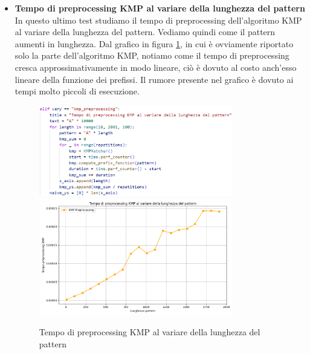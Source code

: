 \documentclass{article}
\begin{document}
\begin{itemize}
    \item \textbf{Tempo di preprocessing KMP al variare della lunghezza del pattern}\\
        In questo ultimo test studiamo il tempo di preprocessing dell'algoritmo KMP al variare della lunghezza del pattern. Vediamo quindi come il pattern aumenti in lunghezza. Dal grafico in figura \ref{fig:test-8}, in cui è ovviamente riportato solo la parte dell'algoritmo KMP, notiamo come il tempo di preprocessing cresca approssimativamente in modo lineare, ciò è dovuto al costo anch'esso lineare della funzione dei prefissi. Il rumore presente nel grafico è dovuto ai tempi molto piccoli di esecuzione.
        \begin{figure}[H]
            \centering
            \includegraphics[width=0.8\textwidth]{img/Test8.png}
            \includegraphics[width=0.8\textwidth]{img/Graph8.png}
            \caption{Tempo di preprocessing KMP al variare della lunghezza del pattern}
            \label{fig:test-8}
        \end{figure}
\end{itemize}

\newpage
\end{document}
